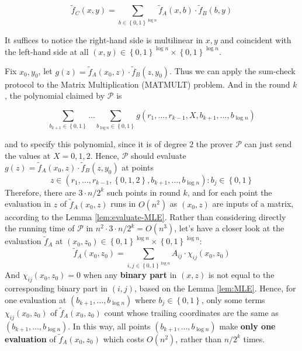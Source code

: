\documentclass{article}
\begin{document}
\begin{lemma}
\begin{equation*}
\widetilde{f}_C(x, y) = \sum_{b \in \left\{ 0, 1 \right\}^{ \log n}} \widetilde{f}_A(x, b) \cdot \widetilde{f}_B(b, y)
\end{equation*}
\end{lemma}

It suffices to notice the right-hand side is multilinear in $x, y$ and coincident with the left-hand side at all $(x, y) \in \left\{ 0, 1 \right\}^{\log n} \times \left\{ 0, 1 \right\}^{\log n}$.

\begin{remark} \label{sec:matrix-mult}
Fix $x_{0}, y_{0}$, let $g(z) = \widetilde{f}_A(x_{0}, z) \cdot \widetilde{f}_B(z, y_{0})$. Thus we can apply the sum-check protocol to the Matrix Multiplication (M{\footnotesize AT}M{\footnotesize ULT}) problem. And in the round $k$, the polynomial claimed by $\mathcal{P}$ is

\begin{equation*}
\sum_{b_{k+1} \in \left\{ 0, 1 \right\}} \dots \sum_{b_{\log n} \in \left\{ 0, 1 \right\}} g(r_1, \dots, r_{k-1}, X, b_{k+1}, \dots, b_{\log n})
\end{equation*}

and to specify this polynomial, since it is of degree $2$ the prover $\mathcal{P}$ can just send the values at $X = 0, 1, 2$. Hence, $\mathcal{P}$ should evaluate $g(z) = \widetilde{f}_A(x_{0}, z) \cdot \widetilde{f}_B(z, y_{0})$ at points
\begin{equation*}
z \in \left( r_1, \dots, r_{k-1}, \left\{ 0, 1, 2 \right\}, b_{k+1}, \dots, b_{\log n} \right): b_j \in \left\{ 0, 1 \right\}
\end{equation*}
Therefore, there are $3 \cdot n/2^k$ such points in round $k$, and for each point the evaluation in $z$ of $\widetilde{f}_A(x_{0}, z)$ runs in $O(n^2)$ as $(x_0, z)$ are inputs of a matrix, according to the Lemma \ref{lem:evaluate-MLE}. Rather than considering directly the running time of $\mathcal{P}$ in $n^2 \cdot 3 \cdot n/2^k = O(n^{3})$, let's have a closer look at the evaluation $\widetilde{f}_A$ at $(x_0, z_0) \in \left\{ 0, 1 \right\}^{\log n} \times  \left\{ 0, 1 \right\}^{\log n}$:
\begin{equation*}
 \widetilde{f}_A(x_{0}, z_{0}) = \sum_{i, j \in \left\{ 0, 1 \right\}^{\log n}} A_{ij} \cdot \chi_{ij}(x_{0}, z_{0})
\end{equation*}
And $\chi_{ij}(x_{0}, z_{0}) = 0$ when any \textbf{binary part} in $(x, z)$ is not equal to the corresponding binary part in $(i, j)$, based on the Lemma \ref{lem:MLE}. Hence, for one evaluation at $(b_{k+1}, \dots, b_{\log n})$ where $b_j \in \left\{ 0, 1 \right\}$, only some terms $\chi_{ij}(x_{0}, z_{0})$ of $ \widetilde{f}_A(x_{0}, z_{0})$ count whose trailing coordinates are the same as $(b_{k+1}, \dots, b_{\log n})$. In this way, all points $(b_{k+1}, \dots, b_{\log n})$ make \textbf{only one evaluation} of $\widetilde{f}_A(x_{0}, z_{0})$ which costs $O(n^{2})$, rather than $n/2^k$ times. 

\end{remark}
\end{document}
